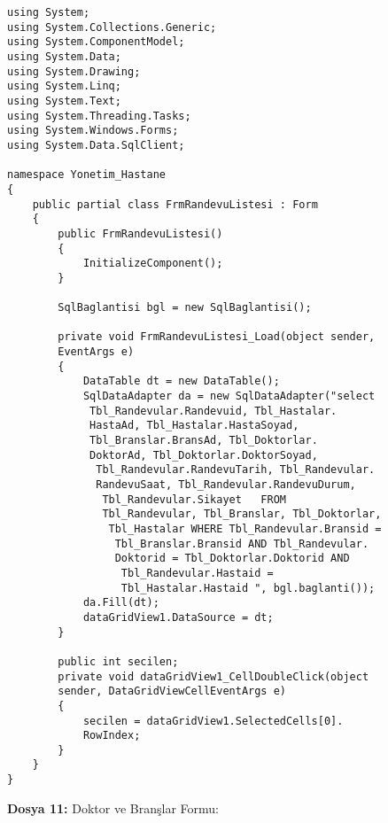 \begin{lstlisting}
using System;
using System.Collections.Generic;
using System.ComponentModel;
using System.Data;
using System.Drawing;
using System.Linq;
using System.Text;
using System.Threading.Tasks;
using System.Windows.Forms;
using System.Data.SqlClient;

namespace Yonetim_Hastane
{
    public partial class FrmRandevuListesi : Form
    {
        public FrmRandevuListesi()
        {
            InitializeComponent();
        }

        SqlBaglantisi bgl = new SqlBaglantisi();

        private void FrmRandevuListesi_Load(object sender, 
        EventArgs e)
        {
            DataTable dt = new DataTable();
            SqlDataAdapter da = new SqlDataAdapter("select
             Tbl_Randevular.Randevuid, Tbl_Hastalar.
             HastaAd, Tbl_Hastalar.HastaSoyad, 
             Tbl_Branslar.BransAd, Tbl_Doktorlar.
             DoktorAd, Tbl_Doktorlar.DoktorSoyad,
              Tbl_Randevular.RandevuTarih, Tbl_Randevular.
              RandevuSaat, Tbl_Randevular.RandevuDurum,
               Tbl_Randevular.Sikayet   FROM 
               Tbl_Randevular, Tbl_Branslar, Tbl_Doktorlar,
                Tbl_Hastalar WHERE Tbl_Randevular.Bransid =
                 Tbl_Branslar.Bransid AND Tbl_Randevular.
                 Doktorid = Tbl_Doktorlar.Doktorid AND
                  Tbl_Randevular.Hastaid = 
                  Tbl_Hastalar.Hastaid ", bgl.baglanti());
            da.Fill(dt);
            dataGridView1.DataSource = dt;
        }

        public int secilen;
        private void dataGridView1_CellDoubleClick(object 
        sender, DataGridViewCellEventArgs e)
        {
            secilen = dataGridView1.SelectedCells[0].
            RowIndex;
        }
    }
}
\end{lstlisting}

\textbf{Dosya 11:} Doktor ve Branşlar Formu:

